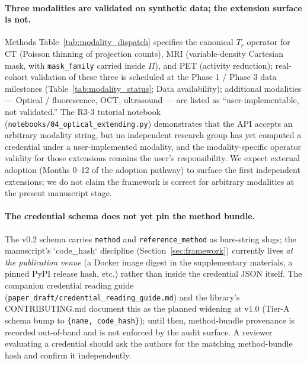 \documentclass[twoside,11pt]{article}
\begin{document}
\paragraph{Three modalities are validated on synthetic data; the extension surface is not.} Methods Table~\ref{tab:modality_dispatch} specifies the canonical $T_r$ operator for CT (Poisson thinning of projection counts), MRI (variable-density Cartesian mask, with \texttt{mask\_family} carried inside $\Pi$), and PET (activity reduction); real-cohort validation of these three is scheduled at the Phase 1 / Phase 3 data milestones (Table~\ref{tab:modality_status}; Data availability); additional modalities --- Optical / fluorescence, OCT, ultrasound --- are listed as ``user-implementable, not validated.'' The R3-3 tutorial notebook (\texttt{notebooks/04\_optical\_extending.py}) demonstrates that the API accepts an arbitrary modality string, but no independent research group has yet computed a credential under a user-implemented modality, and the modality-specific operator validity for those extensions remains the user's responsibility. We expect external adoption (Months 0--12 of the adoption pathway) to surface the first independent extensions; we do not claim the framework is correct for arbitrary modalities at the present manuscript stage.

\paragraph{The credential schema does not yet pin the method bundle.} The v0.2 schema carries \texttt{method} and \texttt{reference\_method} as bare-string slugs; the manuscript's `code\_hash` discipline (Section~\ref{sec:framework}) currently lives \emph{at the publication venue} (a Docker image digest in the supplementary materials, a pinned PyPI release hash, etc.) rather than inside the credential JSON itself. The companion credential reading guide (\texttt{paper\_draft/credential\_reading\_guide.md}) and the library's CONTRIBUTING.md document this as the planned widening at v1.0 (Tier-A schema bump to \texttt{\{name, code\_hash\}}); until then, method-bundle provenance is recorded out-of-band and is not enforced by the audit surface. A reviewer evaluating a credential should ask the authors for the matching method-bundle hash and confirm it independently.
\end{document}
